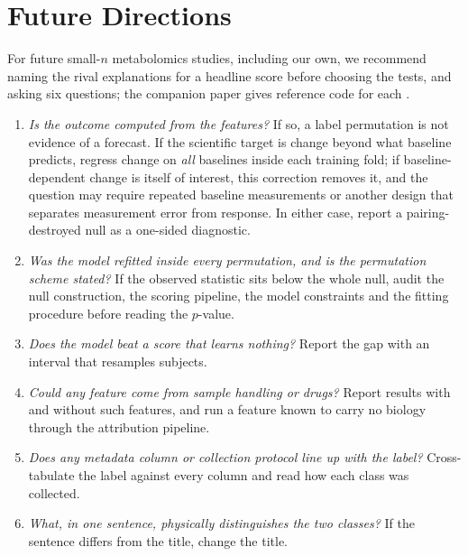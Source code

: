 \documentclass[conference]{IEEEtran}
\begin{document}
\section{Future Directions}
\label{sec:future}

For future small-$n$ metabolomics studies, including our own, we recommend
naming the rival explanations for a headline score before choosing the
tests, and asking six questions; the companion paper gives reference code
for each \cite{vyw}.

\begin{enumerate}
  \item \emph{Is the outcome computed from the features?} If so, a label
        permutation is not evidence of a forecast. If the scientific target
        is change beyond what baseline predicts, regress change on
        \emph{all} baselines inside each training fold; if baseline-dependent
        change is itself of interest, this correction removes it, and the
        question may require repeated baseline measurements or another
        design that separates measurement error from response. In either
        case, report a pairing-destroyed null as a one-sided diagnostic.
  \item \emph{Was the model refitted inside every permutation, and is the
        permutation scheme stated?} If the observed statistic sits below
        the whole null, audit the null construction, the scoring pipeline,
        the model constraints and the fitting procedure before reading the
        $p$-value.
  \item \emph{Does the model beat a score that learns nothing?} Report the
        gap with an interval that resamples subjects.
  \item \emph{Could any feature come from sample handling or drugs?} Report
        results with and without such features, and run a feature known to
        carry no biology through the attribution pipeline.
  \item \emph{Does any metadata column or collection protocol line up with
        the label?} Cross-tabulate the label against every column and read
        how each class was collected.
  \item \emph{What, in one sentence, physically distinguishes the two
        classes?} If the sentence differs from the title, change the title.
\end{enumerate}
\end{document}
